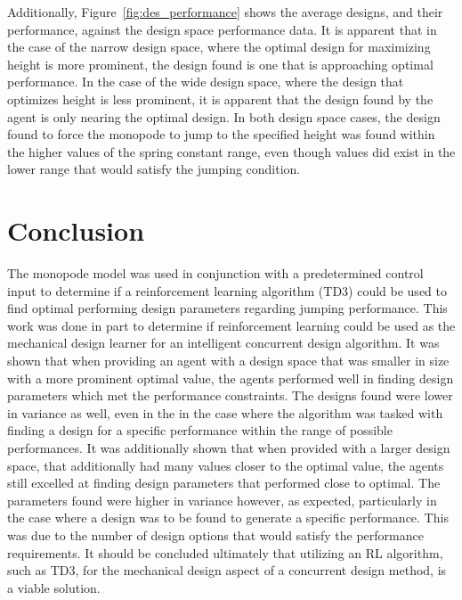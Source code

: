 Additionally, Figure~\ref{fig:des_performance} shows the average designs, and their performance, against the design space performance data. It is apparent that in the case of the narrow design space, where the optimal design for maximizing height is more prominent, the design found is one that is approaching optimal performance. In the case of the wide design space, where the design that optimizes height is less prominent, it is apparent that the design found by the agent is only nearing the optimal design. In both design space cases, the design found to force the monopode to jump to the specified height was found within the higher values of the spring constant range, even though values did exist in the lower range that would satisfy the jumping condition.

\section{Conclusion}
The monopode model was used in conjunction with a predetermined control input to determine if a reinforcement learning algorithm (TD3) could be used to find optimal performing design parameters regarding jumping performance. This work was done in part to determine if reinforcement learning could be used as the mechanical design learner for an intelligent concurrent design algorithm. It was shown that when providing an agent with a design space that was smaller in size with a more prominent optimal value, the agents performed well in finding design parameters which met the performance constraints. The designs found were lower in variance as well, even in the in the case where the algorithm was tasked with finding a design for a specific performance within the range of possible performances. It was additionally shown that when provided with a larger design space, that additionally had many values closer to the optimal value, the agents still excelled at finding design parameters that performed close to optimal. The parameters found were higher in variance however, as expected, particularly in the case where a design was to be found to generate a specific performance. This was due to the number of design options that would satisfy the performance requirements. It should be concluded ultimately that utilizing an RL algorithm, such as TD3, for the mechanical design aspect of a concurrent design method, is a viable solution.